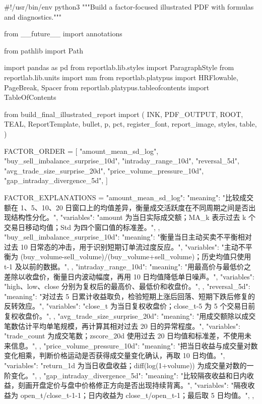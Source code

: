 \documentclass[UTF8,a4paper,fontset=fandol]{ctexart}
\begin{document}
\begin{ProjectCode}
#!/usr/bin/env python3
"""Build a factor-focused illustrated PDF with formulas and diagnostics."""

from __future__ import annotations

from pathlib import Path

import pandas as pd
from reportlab.lib.styles import ParagraphStyle
from reportlab.lib.units import mm
from reportlab.platypus import HRFlowable, PageBreak, Spacer
from reportlab.platypus.tableofcontents import TableOfContents

from build_final_illustrated_report import (
    INK,
    PDF_OUTPUT,
    ROOT,
    TEAL,
    ReportTemplate,
    bullet,
    p,
    pct,
    register_font,
    report_image,
    styles,
    table,
)


FACTOR_ORDER = [
    "amount_mean_sd_log",
    "buy_sell_imbalance_surprise_10d",
    "intraday_range_10d",
    "reversal_5d",
    "avg_trade_size_surprise_20d",
    "price_volume_pressure_10d",
    "gap_intraday_divergence_5d",
]

FACTOR_EXPLANATIONS = {
    "amount_mean_sd_log": {
        "meaning": "比较成交额在 1、5、10、20 日窗口上的均值差异，衡量成交活跃度在不同周期之间是否出现结构性分化。",
        "variables": "amount 为当日实际成交额；MA_k 表示过去 k 个交易日移动均值；Std 为四个窗口值的标准差。",
    },
    "buy_sell_imbalance_surprise_10d": {
        "meaning": "衡量当日主动买卖不平衡相对过去 10 日常态的冲击，用于识别短期订单流过度反应。",
        "variables": "主动不平衡为 (buy_volume-sell_volume)/(buy_volume+sell_volume)；历史均值只使用 t-1 及以前的数据。",
    },
    "intraday_range_10d": {
        "meaning": "用最高价与最低价之差除以收盘价，衡量日内波动幅度，再用 10 日均值降低单日噪声。",
        "variables": "high、low、close 分别为复权后的最高价、最低价和收盘价。",
    },
    "reversal_5d": {
        "meaning": "对过去 5 日累计收益取负，检验短期上涨后回落、短期下跌后修复的反转效应。",
        "variables": "close_t 为当日复权收盘价；close_t-5 为 5 个交易日前复权收盘价。",
    },
    "avg_trade_size_surprise_20d": {
        "meaning": "用成交额除以成交笔数估计平均单笔规模，再计算其相对过去 20 日的异常程度。",
        "variables": "trade_count 为成交笔数；zscore_20d 使用过去 20 日均值和标准差，不使用未来信息。",
    },
    "price_volume_pressure_10d": {
        "meaning": "把当日收益与成交量对数变化相乘，判断价格运动是否获得成交量变化确认，再取 10 日均值。",
        "variables": "return_1d 为当日收盘收益；diff(log(1+volume)) 为成交量对数的一阶变化。",
    },
    "gap_intraday_divergence_5d": {
        "meaning": "比较隔夜收益和日内收益，刻画开盘定价与盘中价格修正方向是否出现持续背离。",
        "variables": "隔夜收益为 open_t/close_t-1-1；日内收益为 close_t/open_t-1；最后取 5 日均值。",
    },
}



\end{ProjectCode}
\end{document}
